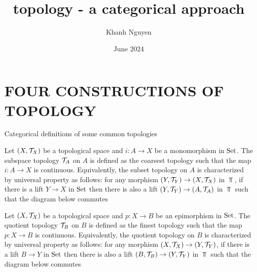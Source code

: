 \documentclass{report}
\title{topology - a categorical approach}
\author{Khanh Nguyen}
\date{June 2024}
\begin{document}
\maketitle

\chapter{FOUR CONSTRUCTIONS OF TOPOLOGY}

Categorical definitions of some common topologies

\begin{definition}
    Let $(X, \mathcal{T}_X)$ be a topological space and $i: A \to X$ be a monomorphism in $\operatorname{Set}$. The subspace topology $\mathcal{T}_A$ on $A$ is defined as the coarsest topology such that the map $i: A \to X$ is continuous. Equivalently, the subset topology on $A$ is characterized by universal property as follows: for any morphism $(Y, \mathcal{T}_Y) \to (X, \mathcal{T}_X)$ in $\Top$, if there is a lift $Y \to X$ in $\operatorname{Set}$ then there is also a lift $(Y, \mathcal{T}_Y) \to (A, \mathcal{T}_A)$ in $\Top$ such that the diagram below commutes
    \begin{center}
    \end{center}
\end{definition}

\begin{definition}
    Let $(X, \mathcal{T}_X)$ be a topological space and $p: X \to B$ be an epimorphism in $\operatorname{Set}$. The quotient topology $\mathcal{T}_B$ on $B$ is defined as the finest topology such that the map $p: X \to B$ is continuous. Equivalently, the quotient topology on $B$ is characterized by universal property as follows: for any morphism $(X, \mathcal{T}_X) \to (Y, \mathcal{T}_Y)$, if there is a lift $B \to Y$ in $\operatorname{Set}$ then there is also a lift $(B, \mathcal{T}_B) \to (Y, \mathcal{T}_Y)$ in $\Top$ such that the diagram below commutes
    \begin{center}
    \end{center}
\end{definition}
\end{document}
